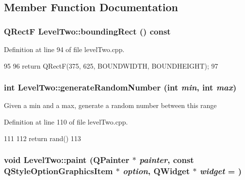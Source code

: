 \subsection{Member Function Documentation}
\hypertarget{class_level_two_a561fec1e212f4d26804a366a4cfbd1a0}{
\subsubsection[{boundingRect}]{\setlength{\rightskip}{0pt plus 5cm}QRectF LevelTwo::boundingRect () const}}
\label{class_level_two_a561fec1e212f4d26804a366a4cfbd1a0}


Definition at line 94 of file levelTwo.cpp.


\begin{DoxyCode}
95 {
96     return QRectF(375, 625, BOUNDWIDTH, BOUNDHEIGHT);
97 }
\end{DoxyCode}
\hypertarget{class_level_two_a8ab22fa3c5b30e4ad12a2e15edc12de8}{
\subsubsection[{generateRandomNumber}]{\setlength{\rightskip}{0pt plus 5cm}int LevelTwo::generateRandomNumber (int {\em min}, \/  int {\em max})}}
\label{class_level_two_a8ab22fa3c5b30e4ad12a2e15edc12de8}
Given a min and a max, generate a random number between this range 

Definition at line 110 of file levelTwo.cpp.


\begin{DoxyCode}
111 {
112     return rand() %
113 }
\end{DoxyCode}
\hypertarget{class_level_two_a447071bde5f8ea9035148d3e207b543b}{
\subsubsection[{paint}]{\setlength{\rightskip}{0pt plus 5cm}void LevelTwo::paint (QPainter $\ast$ {\em painter}, \/  const QStyleOptionGraphicsItem $\ast$ {\em option}, \/  QWidget $\ast$ {\em widget} = {})}}
\label{class_level_two_a447071bde5f8ea9035148d3e207b543b}


